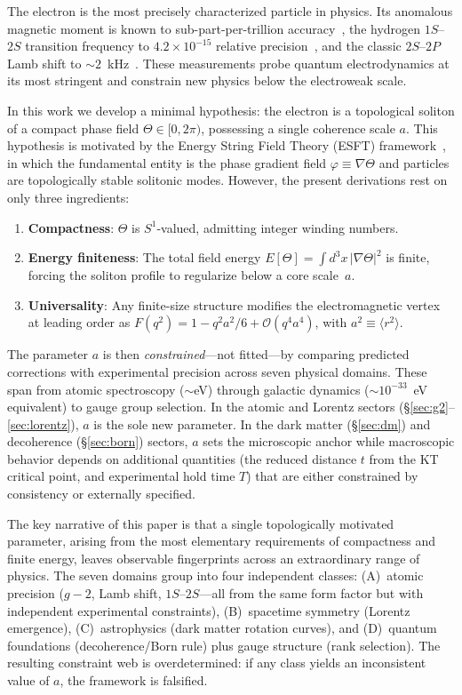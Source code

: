 ﻿\documentclass[a4paper,12pt]{article}
\newcommand{\vev}[1]{\langle #1 \rangle}
\newcommand{\order}[1]{\mathcal{O}(#1)}
\begin{document}
The electron is the most precisely characterized particle in physics.
Its anomalous magnetic moment is known to sub-part-per-trillion
accuracy~\cite{Fan2023,Morel2020}, the hydrogen $1S$--$2S$ transition
frequency to $4.2\times 10^{-15}$ relative precision~\cite{Parthey2011},
and the classic $2S$--$2P$ Lamb shift to $\sim 2$~kHz~\cite{Bezginov2019}.
These measurements probe quantum electrodynamics at its most stringent
and constrain new physics below the electroweak scale.

In this work we develop a minimal hypothesis: the electron is a
topological soliton of a compact phase field $\Theta\in[0,2\pi)$,
possessing a single coherence scale $a$.  This hypothesis is motivated
by the Energy String Field Theory (ESFT) framework~\cite{ESFT}, in
which the fundamental entity is the phase gradient field
$\varphi\equiv\nabla\Theta$ and particles are topologically stable
solitonic modes.  However, the present derivations rest on only three
ingredients:
\begin{enumerate}
  \item \textbf{Compactness}: $\Theta$ is $S^1$-valued, admitting
    integer winding numbers.
  \item \textbf{Energy finiteness}: The total field energy
    $E[\Theta]=\int d^3x\,|\nabla\Theta|^2$ is finite, forcing
    the soliton profile to regularize below a core scale~$a$.
  \item \textbf{Universality}: Any finite-size structure modifies the
    electromagnetic vertex at leading order as
    $F(q^2)=1-q^2a^2/6+\order{q^4a^4}$, with $a^2\equiv\vev{r^2}$.
\end{enumerate}

The parameter $a$ is then \emph{constrained}---not fitted---by comparing
predicted corrections with experimental precision across seven
physical domains.  These span from atomic spectroscopy
($\sim$eV) through galactic dynamics ($\sim 10^{-33}$~eV equivalent)
to gauge group selection.  In the atomic and Lorentz sectors (§\ref{sec:g2}--\ref{sec:lorentz}),
$a$ is the sole new parameter.  In the dark matter (§\ref{sec:dm})
and decoherence (§\ref{sec:born}) sectors, $a$ sets the microscopic
anchor while macroscopic behavior depends on additional
quantities (the reduced distance $t$ from the KT critical point,
and experimental hold time $T$) that are either constrained by
consistency or externally specified.

The key narrative of this paper is that a single topologically motivated
parameter, arising from the most elementary requirements of compactness
and finite energy, leaves observable fingerprints across an extraordinary
range of physics.  The seven domains group into four independent
classes: (A)~atomic precision ($g{-}2$, Lamb shift, $1S$--$2S$---all
from the same form factor but with independent experimental
constraints), (B)~spacetime symmetry (Lorentz emergence),
(C)~astrophysics (dark matter rotation curves), and (D)~quantum
foundations (decoherence/Born rule) plus gauge structure (rank
selection).  The resulting constraint web is overdetermined: if any
class yields an inconsistent value of $a$, the framework is falsified.
\end{document}
